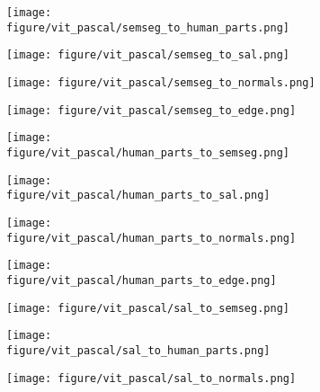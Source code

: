 \begin{figure}[h]
    \centering
    \begin{subfigure}{0.24\textwidth}
        \texttt{[image: figure/vit\_pascal/semseg\_to\_human\_parts.png]}
    \end{subfigure}
    \begin{subfigure}{0.24\textwidth}
        \texttt{[image: figure/vit\_pascal/semseg\_to\_sal.png]}
    \end{subfigure}
    \begin{subfigure}{0.24\textwidth}
        \texttt{[image: figure/vit\_pascal/semseg\_to\_normals.png]}
    \end{subfigure}
    \begin{subfigure}{0.24\textwidth}
        \texttt{[image: figure/vit\_pascal/semseg\_to\_edge.png]}
    \end{subfigure}
    \hfill
    \begin{subfigure}{0.24\textwidth}
        \texttt{[image: figure/vit\_pascal/human\_parts\_to\_semseg.png]}
    \end{subfigure}
    \begin{subfigure}{0.24\textwidth}
        \texttt{[image: figure/vit\_pascal/human\_parts\_to\_sal.png]}
    \end{subfigure}
    \begin{subfigure}{0.24\textwidth}
        \texttt{[image: figure/vit\_pascal/human\_parts\_to\_normals.png]}
    \end{subfigure}
    \begin{subfigure}{0.24\textwidth}
        \texttt{[image: figure/vit\_pascal/human\_parts\_to\_edge.png]}
    \end{subfigure}
    \hfill
    \begin{subfigure}{0.24\textwidth}
        \texttt{[image: figure/vit\_pascal/sal\_to\_semseg.png]}
    \end{subfigure}
    \begin{subfigure}{0.24\textwidth}
        \texttt{[image: figure/vit\_pascal/sal\_to\_human\_parts.png]}
    \end{subfigure}
    \begin{subfigure}{0.24\textwidth}
        \texttt{[image: figure/vit\_pascal/sal\_to\_normals.png]}
    \end{subfigure}

\end{figure}
